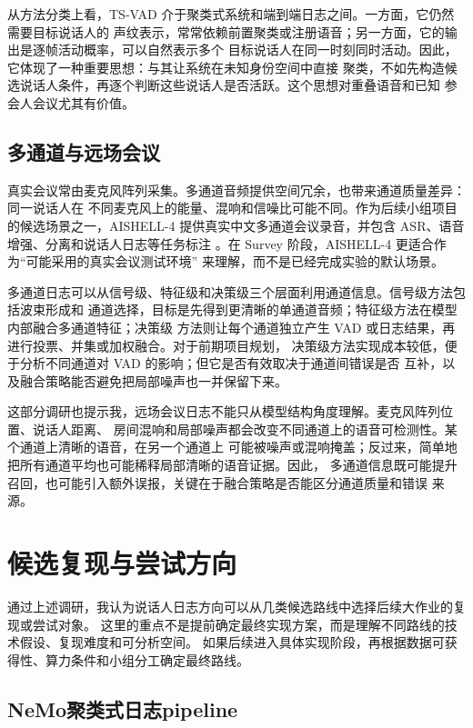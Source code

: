 \documentclass[UTF8,a4paper,10pt]{ctexart}
\begin{document}
从方法分类上看，TS-VAD 介于聚类式系统和端到端日志之间。一方面，它仍然需要目标说话人的
声纹表示，常常依赖前置聚类或注册语音；另一方面，它的输出是逐帧活动概率，可以自然表示多个
目标说话人在同一时刻同时活动。因此，它体现了一种重要思想：与其让系统在未知身份空间中直接
聚类，不如先构造候选说话人条件，再逐个判断这些说话人是否活跃。这个思想对重叠语音和已知
参会人会议尤其有价值。

\subsection{多通道与远场会议}

真实会议常由麦克风阵列采集。多通道音频提供空间冗余，也带来通道质量差异：同一说话人在
不同麦克风上的能量、混响和信噪比可能不同。作为后续小组项目的候选场景之一，AISHELL-4
提供真实中文多通道会议录音，并包含 ASR、语音增强、分离和说话人日志等任务标注
\cite{fu2021aishell4}。在 Survey 阶段，AISHELL-4 更适合作为“可能采用的真实会议测试环境”
来理解，而不是已经完成实验的默认场景。

多通道日志可以从信号级、特征级和决策级三个层面利用通道信息。信号级方法包括波束形成和
通道选择，目标是先得到更清晰的单通道音频；特征级方法在模型内部融合多通道特征；决策级
方法则让每个通道独立产生 VAD 或日志结果，再进行投票、并集或加权融合。对于前期项目规划，
决策级方法实现成本较低，便于分析不同通道对 VAD 的影响；但它是否有效取决于通道间错误是否
互补，以及融合策略能否避免把局部噪声也一并保留下来。

这部分调研也提示我，远场会议日志不能只从模型结构角度理解。麦克风阵列位置、说话人距离、
房间混响和局部噪声都会改变不同通道上的语音可检测性。某个通道上清晰的语音，在另一个通道上
可能被噪声或混响掩盖；反过来，简单地把所有通道平均也可能稀释局部清晰的语音证据。因此，
多通道信息既可能提升召回，也可能引入额外误报，关键在于融合策略是否能区分通道质量和错误
来源。

\section{候选复现与尝试方向}

通过上述调研，我认为说话人日志方向可以从几类候选路线中选择后续大作业的复现或尝试对象。
这里的重点不是提前确定最终实现方案，而是理解不同路线的技术假设、复现难度和可分析空间。
如果后续进入具体实现阶段，再根据数据可获得性、算力条件和小组分工确定最终路线。

\subsection{NeMo聚类式日志pipeline}
\end{document}
